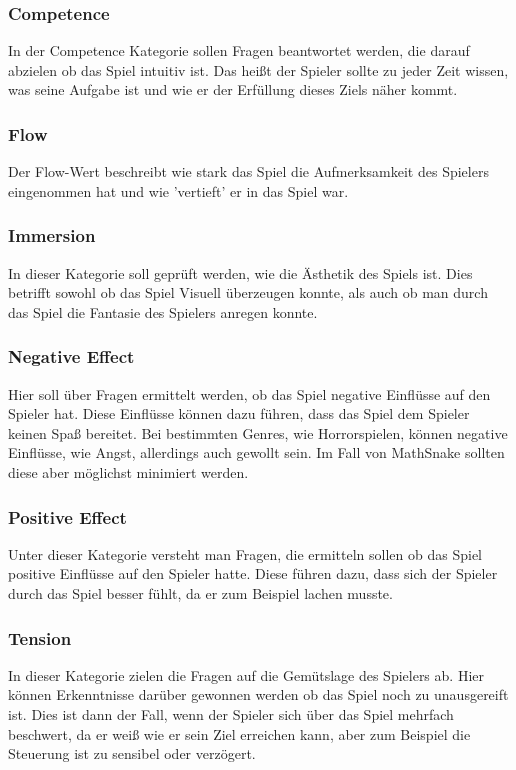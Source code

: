 \subsubsection{Competence}
In der Competence Kategorie sollen Fragen beantwortet werden, die darauf abzielen ob das Spiel intuitiv ist. Das heißt der Spieler sollte zu jeder Zeit wissen, was seine Aufgabe ist und wie er der Erfüllung dieses Ziels näher kommt.
\subsubsection{Flow}
Der Flow-Wert beschreibt wie stark das Spiel die Aufmerksamkeit des Spielers eingenommen hat und wie 'vertieft'  er in das Spiel war.
\subsubsection{Immersion}
In dieser Kategorie soll geprüft werden, wie die Ästhetik des Spiels ist. Dies betrifft sowohl ob das Spiel Visuell überzeugen konnte, als auch ob man durch das Spiel die Fantasie des Spielers anregen konnte.
\subsubsection{Negative Effect}
Hier soll über Fragen ermittelt werden, ob das Spiel negative Einflüsse auf den Spieler hat. Diese Einflüsse können dazu führen, dass das Spiel dem Spieler keinen Spaß bereitet. Bei bestimmten Genres, wie Horrorspielen, können negative Einflüsse, wie Angst, allerdings auch gewollt sein. Im Fall von MathSnake sollten diese aber möglichst minimiert werden.
\subsubsection{Positive Effect}
Unter dieser Kategorie versteht man Fragen, die ermitteln sollen ob das Spiel positive Einflüsse auf den Spieler hatte. Diese führen dazu, dass sich der Spieler durch das Spiel besser fühlt, da er zum Beispiel lachen musste.
\subsubsection{Tension}
In dieser Kategorie zielen die Fragen auf die Gemütslage des Spielers ab. Hier können Erkenntnisse darüber gewonnen werden ob das Spiel noch zu unausgereift ist. Dies ist dann der Fall, wenn der Spieler sich über das Spiel mehrfach beschwert, da er weiß wie er sein Ziel erreichen kann, aber zum Beispiel die Steuerung ist zu sensibel oder verzögert.

